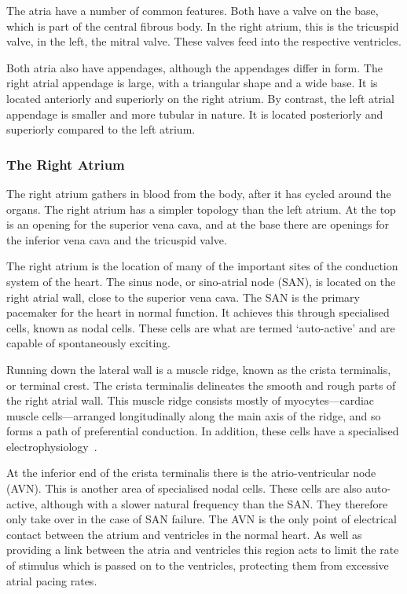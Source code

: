 The atria have a number of common features.
Both have a valve on the base, which is part of the central fibrous body.
In the right atrium, this is the tricuspid valve, in the left, the mitral valve.
These valves feed into the respective ventricles.

Both atria also have appendages, although the appendages differ in form.
The right atrial appendage is large, with a triangular shape and a wide base.
It is located anteriorly and superiorly on the right atrium.
By contrast, the left atrial appendage is smaller and more tubular in nature.
It is located posteriorly and superiorly compared to the left atrium.

\subsubsection{The Right Atrium}

The right atrium gathers in blood from the body, after it has cycled around the
organs.
The right atrium has a simpler topology than the left atrium.
At the top is an opening for the superior vena cava, and at the base there are
openings for the inferior vena cava and the tricuspid valve.

The right atrium is the location of many of the important sites of the
conduction system of the heart.
The sinus node, or sino-atrial node (SAN), is located on the right atrial wall,
close to the superior vena cava.
The SAN is the primary pacemaker for the heart in normal function.
It achieves this through specialised cells, known as nodal cells.
These cells are what are termed `auto-active' and are capable of spontaneously
exciting.

Running down the lateral wall is a muscle ridge, known as the crista terminalis,
or terminal crest.
The crista terminalis delineates the smooth and rough parts of the right atrial
wall.
This muscle ridge consists mostly of myocytes---cardiac muscle cells---arranged
longitudinally along the main axis of the ridge, and so forms a path of
preferential conduction.
In addition, these cells have a specialised electrophysiology~\cite{Feng1998}.

At the inferior end of the crista terminalis there is the atrio-ventricular
node (AVN).
This is another area of specialised nodal cells.
These cells are also auto-active, although with a slower natural frequency than
the SAN.
They therefore only take over in the case of SAN failure.
The AVN is the only point of electrical contact between the atrium and
ventricles in the normal heart.
As well as providing a link between the atria and ventricles this region acts
to limit the rate of stimulus which is passed on to the ventricles, protecting
them from excessive atrial pacing rates.

